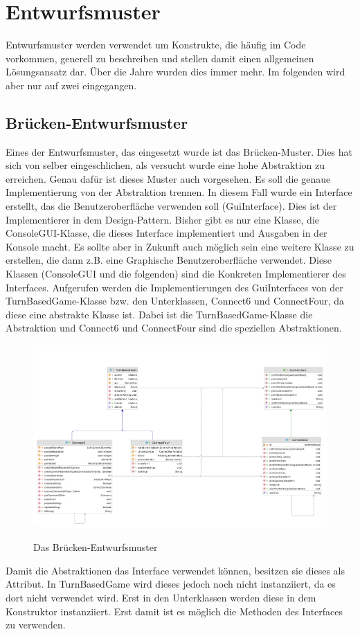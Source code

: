 \documentclass[12pt]{article}
\newcommand{\BridgePattern}{\includegraphics[height=7cm]{Bilder/Bridge_complete}}
\begin{document}
\newpage
\section{Entwurfsmuster}
Entwurfsmuster werden verwendet um Konstrukte, die häufig im Code vorkommen, generell zu beschreiben und stellen damit einen allgemeinen Lösungsansatz dar. Über die Jahre wurden dies immer mehr. Im folgenden wird aber nur auf zwei eingegangen.



\subsection{Brücken-Entwurfsmuster}
Eines der Entwurfsmuster, das eingesetzt wurde ist das Brücken-Muster. Dies hat sich von selber eingeschlichen, als versucht wurde eine hohe Abstraktion zu erreichen. Genau dafür ist dieses Muster auch vorgesehen. Es soll die genaue Implementierung von der Abstraktion trennen. In diesem Fall wurde ein Interface erstellt, das die Benutzeroberfläche verwenden soll (GuiInterface). Dies ist der Implementierer in dem Design-Pattern. Bisher gibt es nur eine Klasse, die ConsoleGUI-Klasse, die dieses Interface implementiert und Ausgaben in der Konsole macht. Es sollte aber in Zukunft auch möglich sein eine weitere Klasse zu erstellen, die dann z.B. eine Graphische Benutzeroberfläche verwendet. Diese Klassen (ConsoleGUI und die folgenden) sind die Konkreten Implementierer des Interfaces. Aufgerufen werden die Implementierungen des GuiInterfaces von der TurnBasedGame-Klasse bzw. den Unterklassen, Connect6 und ConnectFour, da diese eine abstrakte Klasse ist. Dabei ist die TurnBasedGame-Klasse die Abstraktion und Connect6 und ConnectFour sind die speziellen Abstraktionen.

\begin{figure}[htpb!]
\centering
{\BridgePattern}\\[1cm]
\caption{Das Brücken-Entwurfsmuster}
\label{fig:bridge}
\end{figure}

Damit die Abstraktionen das Interface verwendet können, besitzen sie dieses als Attribut. In TurnBasedGame wird dieses jedoch noch nicht instanziiert, da es dort nicht verwendet wird. Erst in den Unterklassen werden diese in dem Konstruktor instanziiert. Erst damit ist es möglich die Methoden des Interfaces zu verwenden.
\end{document}
